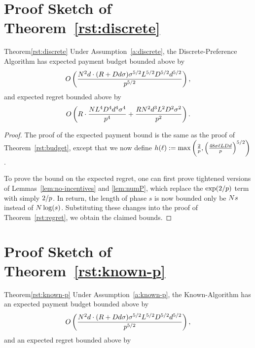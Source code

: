 \section{Proof Sketch of Theorem~\ref{rst:discrete}}
\label{sec:discussion-proof1}

\begin{rtheorem}{Theorem}{\ref{rst:discrete}}
Under Assumption~\ref{a:discrete}, the Discrete-Preference Algorithm has expected payment budget bounded above by 
\begin{align*}
O \left(\frac{N^2 d \cdot (R + D d \sigma)\sigma^{5/2}L^{5/2}D^{5/2}d^{5/2}}{p^{5/2}} \right),
\end{align*}
and expected regret bounded above by 
\begin{align}
O \left(R\cdot \frac{N L^4 D^4 d^4 \sigma^4}{p^4}
  + \frac{R N^2 d^3 L^2 D^2 \sigma^2}{p^2}
  \right).  \nonumber
\end{align}
\end{rtheorem}

\begin{proof}
The proof of the expected payment bound is the same as the proof of Theorem~\ref{rst:budget}, except that we now define $h(\ell) := \max \left( \frac{2}{p},
\left( \frac{48 \sigma \ell L D d}{p} \right)^{5/2}
\right)$.

To prove the bound on the expected regret, one can first prove tightened versions of Lemmas~\ref{lem:no-incentives} and \ref{lem:numP},
which replace the $\exp(2/p)$ term with simply $2/p$.
In return, the length of phase $s$ is now bounded only be $N s$ instead of $N \log(s)$.
Substituting these changes into the proof of Theorem~\ref{rst:regret}, we obtain the claimed bounds.
\end{proof}

\section{Proof Sketch of Theorem~\ref{rst:known-p}}
\label{sec:discussion-proof2}


\begin{rtheorem}{Theorem}{\ref{rst:known-p}}
Under Assumption~\ref{a:known-p}, the Known-\MinProb Algorithm has an expected payment budget bounded above by 
\begin{align*}
O \left(\frac{N^2 d \cdot (R + D d \sigma)\sigma^{5/2}L^{5/2}D^{5/2}d^{5/2}}{p^{5/2}} \right),
\end{align*}
and an expected regret bounded above by
\end{rtheorem}

